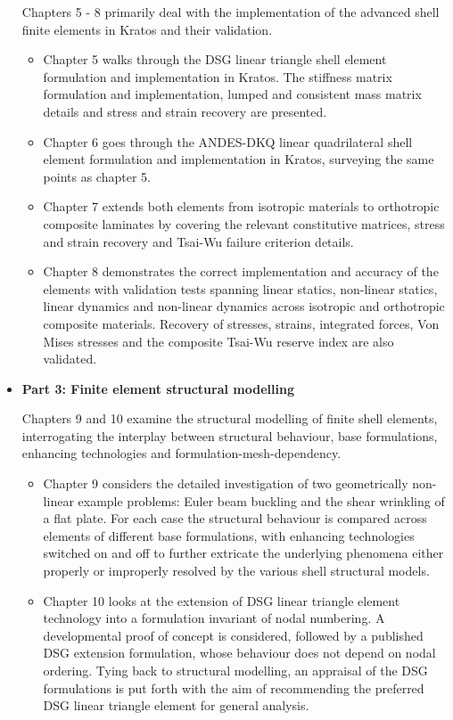 \begin{itemize}
	Chapters 5 - 8 primarily deal with the implementation of the advanced shell finite elements in Kratos and their validation.
	\begin{itemize}
		\item Chapter 5 walks through the DSG linear triangle shell element formulation and implementation in Kratos. The stiffness matrix formulation and implementation, lumped and consistent mass matrix details and stress and strain recovery are presented.
		\item Chapter 6 goes through the ANDES-DKQ linear quadrilateral shell element formulation and implementation in Kratos, surveying the same points as chapter 5.
		\item Chapter 7 extends both elements from isotropic materials to orthotropic composite laminates by covering the relevant constitutive matrices, stress and strain recovery and Tsai-Wu failure criterion details.
		\item Chapter 8 demonstrates the correct implementation and accuracy of the elements with validation tests spanning linear statics, non-linear statics, linear dynamics and non-linear dynamics across isotropic and orthotropic composite materials. Recovery of stresses, strains, integrated forces, Von Mises stresses and the composite Tsai-Wu reserve index are also validated.
	\end{itemize}
	\newpage
	\item \textbf{Part 3: Finite element structural modelling}
	
	Chapters 9 and 10 examine the structural modelling of finite shell elements, interrogating the interplay between structural behaviour, base formulations, enhancing technologies and formulation-mesh-dependency.
	\begin{itemize}
		\item Chapter 9 considers the detailed investigation of two geometrically non-linear example problems: Euler beam buckling and the shear wrinkling of a flat plate. For each case the structural behaviour is compared across elements of different base formulations, with enhancing technologies switched on and off to further extricate the underlying phenomena either properly or improperly resolved by the various shell structural models.
		\item Chapter 10 looks at the extension of DSG linear triangle element technology into a formulation invariant of nodal numbering. A developmental proof of concept is considered, followed by a published DSG extension formulation, whose behaviour does not depend on nodal ordering. Tying back to structural modelling, an appraisal of the DSG formulations is put forth with the aim of recommending the preferred DSG linear triangle element for general analysis.
	\end{itemize}
\end{itemize}


